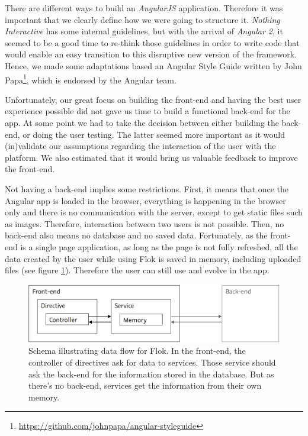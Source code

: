 \documentclass[a4paper,12pt, oneside]{article}
\begin{document}
There are different ways to build an \emph{AngularJS} application.
Therefore it was important that we clearly define how we were going to structure it.
\emph{Nothing Interactive} has some internal guidelines, but with the arrival of \emph{Angular 2}, it seemed to be a good time to re-think those guidelines in order to write code that would enable an easy transition to this disruptive new version of the framework.
Hence, we made some adaptations based an Angular Style Guide written by John Papa\footnote{\url{https://github.com/johnpapa/angular-styleguide}}, which is endorsed by the Angular team.


Unfortunately, our great focus on building the front-end and having the best user experience possible did not gave us time to build a functional back-end for the app.
At some point we had to take the decision between either building the back-end, or doing the user testing.
The latter seemed more important as it would (in)validate our assumptions regarding the interaction of the user with the platform.
We also estimated that it would bring us valuable feedback to improve the front-end.

Not having a back-end implies some restrictions.
First, it means that once the Angular app is loaded in the browser, everything is happening in the browser only and there is no communication with the server, except to get static files such as images.
Therefore, interaction between two users is not possible.
Then, no back-end also means no database and no saved data.
Fortunately, as the front-end is a single page application, as long as the page is not fully refreshed, all the data created by the user while using Flok is saved in memory, including uploaded files (see figure \ref{fig.dealingWithoutBackend}).
Therefore the user can still use and evolve in the app.

\begin{figure}[!htb]
\centering
\includegraphics[width=\textwidth]{images/dealingWithoutBackend.png}
\caption{Schema illustrating data flow for Flok. In the front-end, the controller of directives ask for data to services. Those service should ask the back-end for the information stored in the database. But as there's no back-end, services get the information from their own memory.}
\label{fig.dealingWithoutBackend}
\end{figure}
\end{document}
